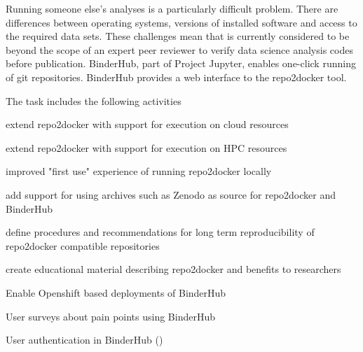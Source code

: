 \begin{task}[
  title=Further development of repo2docker and Binder,
  id=r2d-and-binder,
  lead=SRL,
  PM=36,
  wphases={0-48},
  partners={XFEL,WTT}
]
  Running someone else's analyses is a particularly difficult problem.
  There are differences between operating systems, versions of installed software and access to the required data sets.
  These challenges mean that is currently considered to be beyond the scope of an expert peer reviewer to verify data science analysis codes before publication.
  BinderHub, part of Project Jupyter, enables one-click running of git repositories.
  BinderHub provides a web interface to the repo2docker tool.

  The task includes the following activities
  \begin{compactitem}
  \item extend repo2docker with support for execution on cloud resources
  \item extend repo2docker with support for execution on HPC resources
  \item improved "first use" experience of running repo2docker locally
  \item add support for using archives such as Zenodo as source for repo2docker and BinderHub
  \item define procedures and recommendations for long term reproducibility of repo2docker compatible repositories
  \item create educational material describing repo2docker and benefits to researchers
  \item Enable Openshift based deployments of BinderHub
  \item User surveys about pain points using BinderHub
  \item User authentication in BinderHub
    ()
  \end{compactitem}
\end{task}
